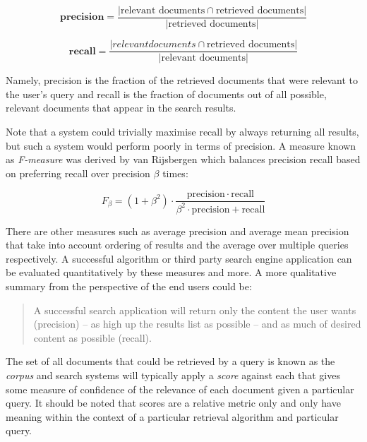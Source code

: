 \begin{displaymath}
  \textbf{precision} = \frac{
    |\text{relevant documents} \cap \text{retrieved documents}|
  }{
    |\text{retrieved documents}|
  }
\end{displaymath}

\begin{displaymath}
  \textbf{recall} = \frac{
    |{relevant documents} \cap \text{retrieved documents}|
  }{
    |\text{relevant documents}|
  }
\end{displaymath}

Namely, precision is the fraction of the retrieved documents that were
relevant to the user's query and recall is the fraction of documents out of
all possible, relevant documents that appear in the search results.

Note that a system could trivially maximise recall by always returning all
results, but such a system would perform poorly in terms of precision. A
measure known as \emph{F-measure} was derived by van Rijsbergen
\cite{rijsbergen1979information} which
balances precision recall based on preferring recall over precision $\beta$
times:

\begin{displaymath}
  F_\beta = (1 + \beta^2) \cdot \frac{\mathrm{precision} \cdot \mathrm{recall} }{ \beta^2 \cdot \mathrm{precision} + \mathrm{recall}}
\end{displaymath}

There are other measures such as average precision and average mean precision
that take into account ordering of results and the average over multiple
queries respectively. A successful algorithm or third party search engine
application can be evaluated quantitatively by these measures and more. A more
qualitative summary from the perspective of the end users could be:

\begin{quote}
  A successful search application will return only the content the user wants
  (precision) --
  as high up the results list as possible -- and as much of desired content
  as possible (recall).
\end{quote}

The set of all documents that could be retrieved by a query is known as the
\emph{corpus} and search systems will typically apply a \emph{score} against
each that gives some measure of confidence of the relevance of each document
given a particular query. It should be noted that scores are a relative
metric only and only have meaning within the context of a particular
retrieval algorithm and particular query.

